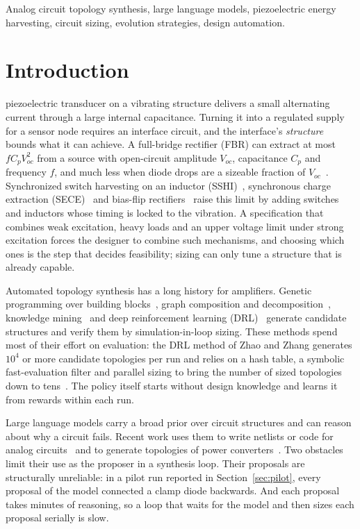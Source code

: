 \documentclass[journal]{IEEEtran}
\begin{document}
\begin{IEEEkeywords}
Analog circuit topology synthesis, large language models, piezoelectric energy harvesting, circuit
sizing, evolution strategies, design automation.
\end{IEEEkeywords}

\section{Introduction}
 piezoelectric transducer on a vibrating structure delivers a small alternating current
through a large internal capacitance. Turning it into a regulated supply for a sensor node requires an
interface circuit, and the interface's \emph{structure} bounds what it can achieve. A full-bridge
rectifier (FBR) can extract at most $f C_p V_{oc}^2$ from a source with open-circuit amplitude $V_{oc}$,
capacitance $C_p$ and frequency $f$, and much less when diode drops are a sizeable fraction of
$V_{oc}$~\cite{lefeuvre2006comparison}. Synchronized switch harvesting on an inductor
(SSHI)~\cite{guyomar2005sshi}, synchronous charge extraction (SECE)~\cite{lefeuvre2005sece} and
bias-flip rectifiers~\cite{ramadass2010biasflip} raise this limit by adding switches and inductors
whose timing is locked to the vibration. A specification that combines weak excitation, heavy loads and
an upper voltage limit under strong excitation forces the designer to combine such mechanisms, and
choosing which ones is the step that decides feasibility; sizing can only tune a structure that is
already capable.

Automated topology synthesis has a long history for amplifiers. Genetic programming over
building blocks~\cite{mcconaghy2011mojito}, graph composition and decomposition~\cite{meissner2015feats,
zhao2020gctg}, knowledge mining~\cite{jiao2015kmr} and deep reinforcement learning (DRL)~\cite{zhao2022drl}
generate candidate structures and verify them by simulation-in-loop sizing. These methods spend most of
their effort on evaluation: the DRL method of Zhao and Zhang generates $10^4$ or more candidate topologies
per run and relies on a hash table, a symbolic fast-evaluation filter and parallel sizing to bring the
number of sized topologies down to tens~\cite{zhao2022drl}. The policy itself starts without design
knowledge and learns it from rewards within each run.

Large language models carry a broad prior over circuit structures and can reason about why a circuit
fails. Recent work uses them to write netlists or code for analog
circuits~\cite{lai2025analogcoder,chen2024artisan} and to generate topologies of power
converters~\cite{chang2024lamagic}. Two obstacles limit their use as the proposer in a synthesis loop.
Their proposals are structurally unreliable: in a pilot run reported in Section~\ref{sec:pilot}, every
proposal of the model connected a clamp diode backwards. And each proposal takes minutes of reasoning, so
a loop that waits for the model and then sizes each proposal serially is slow.
\end{document}
